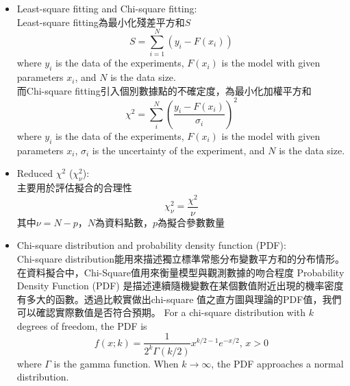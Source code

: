 \documentclass[12pt,a4paper]{article}
\begin{document}
\begin{CJK}{UTF8}{bkai}

\begin{itemize}
    \item Least-square fitting and Chi-square fitting:\\
    Least-square fitting為最小化殘差平方和$S$
    \begin{equation}
        S = \sum^{N}_{i=1}\left(y_i-F(x_i)\right)
    \end{equation}
    where $y_i$ is the data of the experiments, $F(x_i)$ is the model with given parameters $x_i$, and $N$ is the data size.\\
    而Chi-square fitting引入個別數據點的不確定度，為最小化加權平方和
    \begin{equation}
        \chi^2 = \sum^{N}_{i}\left(\frac{y_i-F(x_i)}{\sigma_i}\right)^2
    \end{equation}
    where $y_i$ is the data of the experiments, $F(x_i)$ is the model with given parameters $x_i$, $\sigma_i$ is the uncertainty of the experiment, and $N$ is the data size.
    \item Reduced $\chi^2$ ($\chi_{\nu}^2$):\\
    主要用於評估擬合的合理性
    \begin{equation}
        \chi_{\nu}^{2} = \frac{\chi^2}{\nu}
    \end{equation}
    其中$\nu=N-p$，$N$為資料點數，$p$為擬合參數數量
    \item Chi-square distribution and probability density function (PDF):\\
    Chi-square distribution能用來描述獨立標準常態分布變數平方和的分布情形。在資料擬合中，Chi-Square值用來衡量模型與觀測數據的吻合程度
    Probability Density Function (PDF) 是描述連續隨機變數在某個數值附近出現的機率密度有多大的函數。透過比較實做出chi-square 值之直方圖與理論的PDF值，我們可以確認實際數值是否符合預期。
    For a chi-square distribution with $k$ degrees of freedom, the PDF is 
    \begin{equation}\label{eq:pdf}
        f(x; k) = \frac{1}{2^k\Gamma(k/2)}x^{k/2-1}e^{-x/2}, \, x>0
    \end{equation}
    where $\Gamma$ is the gamma function. When $k\rightarrow\infty$, the PDF approaches a normal distribution.
\end{itemize}



\end{CJK}
\end{document}
